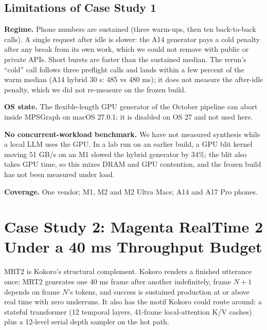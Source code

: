 \documentclass[11pt]{article}
\begin{document}
\subsection{Limitations of Case Study 1}\label{sec:cs1-limits}

\textbf{Regime.} Phone numbers are sustained (three warm-ups, then ten back-to-back calls). A single request after idle is slower: the A14 generator pays a cold penalty after any break from its own work, which we could not remove with public or private APIs. Short bursts are faster than the sustained median. The rerun's ``cold'' call follows three preflight calls and lands within a few percent of the warm median (A14 hybrid 30 s: 485 vs 480 ms); it does not measure the after-idle penalty, which we did not re-measure on the frozen build.

\textbf{OS state.} The flexible-length GPU generator of the October pipeline can abort inside MPSGraph on macOS 27.0.1; it is disabled on OS 27 and not used here.

\textbf{No concurrent-workload benchmark.} We have not measured synthesis while a local LLM uses the GPU. In a lab run on an earlier build, a GPU blit kernel moving 51 GB/s on an M1 slowed the hybrid generator by 34\%; the blit also takes GPU time, so this mixes DRAM and GPU contention, and the frozen build has not been measured under load.

\textbf{Coverage.} One vendor; M1, M2 and M2 Ultra Macs; A14 and A17 Pro phones.

\section{Case Study 2: Magenta RealTime 2 Under a 40 ms Throughput Budget}\label{sec:cs2}

MRT2 is Kokoro's structural complement. Kokoro renders a finished utterance once; MRT2 generates one 40 ms frame after another indefinitely, frame $N+1$ depends on frame $N$'s tokens, and success is sustained production at or above real time with zero underruns. It also has the motif Kokoro could route around: a stateful transformer (12 temporal layers, 41-frame local-attention K/V caches) plus a 12-level serial depth sampler on the hot path.
\end{document}
